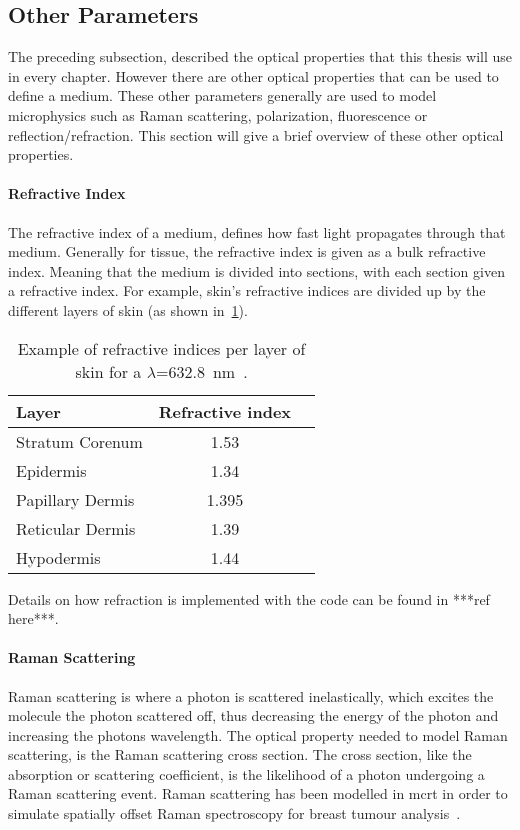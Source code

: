 \subsection{Other Parameters}\label{sec:other}
The preceding subsection, described the optical properties that this thesis will use in every chapter. However there are other optical properties that can be used to define a medium. These other parameters generally are used to model microphysics such as Raman scattering, polarization, fluorescence or reflection/refraction. This section will give a brief overview of these other optical properties.

\medskip

\paragraph*{Refractive Index}
The refractive index of a medium, defines how fast light propagates through that medium. Generally for tissue, the refractive index is given as a bulk refractive index. Meaning that the medium is divided into sections, with each section given a refractive index. For example, skin's refractive indices are divided up by the different layers of skin (as shown in~\cref{tab:refrac}).

\begin{table}[hb!]
	\centering

	\begin{tabular}{|l|cc|}
	\hline

	\hline
	\textbf{Layer} & \textbf{Refractive index} &\\
	\hline

	\hline
		Stratum Corenum & 1.53 & \\
	\hline
		Epidermis & 1.34 & \\
	\hline
		Papillary Dermis & 1.395 &\\
	\hline
		Reticular Dermis & 1.39 &\\
	\hline
		Hypodermis & 1.44 &\\
	\hline

	\hline
	\end{tabular}
	\caption{Example of refractive indices per layer of skin for a $\lambda$=632.8~nm~\cite{meglinski2002quantitative}.}
	\label{tab:refrac}
\end{table}

Details on how refraction is implemented with the code can  be found in ***ref here***.

\medskip

\paragraph*{Raman Scattering}
Raman scattering is where a photon is scattered inelastically, which excites the molecule the photon scattered off, thus decreasing the energy of the photon and increasing the photons wavelength. The optical property needed to model Raman scattering, is the Raman scattering cross section. The cross section, like the absorption or scattering coefficient, is the likelihood of a photon undergoing a Raman scattering event. Raman scattering has been modelled in \gls{mcrt} in order to simulate spatially offset Raman spectroscopy for breast tumour analysis~\cite{keller2010monte}.

